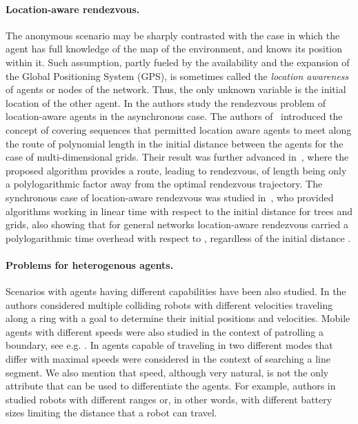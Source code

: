 \documentclass{llncs}
\begin{document}
\paragraph{Location-aware rendezvous.}
The anonymous scenario may be sharply contrasted with the case in which the agent has full knowledge of the map of the environment, and knows its position within it. Such assumption, partly fueled by the availability and the expansion of the Global Positioning System (GPS), is sometimes called the {\em location awareness} of agents or nodes of the network. Thus, the only unknown variable is the initial location of the other agent. In \cite{leszek-async,DISC10} the authors study the rendezvous problem of location-aware agents in the asynchronous case. The authors of~\cite{leszek-async} introduced the concept of covering sequences that permitted location aware agents to meet along the route of polynomial length in the initial distance  between the agents for the case of multi-dimensional grids. Their result was further advanced in~\cite{DISC10}, where the proposed algorithm provides a route, leading to rendezvous, of length being only a polylogarithmic factor away from the optimal rendezvous trajectory. The synchronous case of location-aware rendezvous was studied in~\cite{CCGKM11}, who provided algorithms working in linear time with respect to the initial distance  for trees and grids, also showing that for general networks location-aware rendezvous carried a polylogarithmic time overhead with respect to , regardless of the initial distance .

\paragraph{Problems for heterogenous agents.}
Scenarios with agents having different capabilities have been also studied.
In \cite{CzyzowiczKP13} the authors considered multiple colliding robots with different velocities traveling along a ring with a goal to determine their initial positions and velocities.
Mobile agents with different speeds were also studied in the context of patrolling a boundary, see e.g. \cite{CzyzowiczGKK11,KawamuraK12}.
In \cite{abs-1304-7693} agents capable of traveling in two different modes that differ with maximal speeds were considered in the context of searching a line segment.
We also mention that speed, although very natural, is not the only attribute that can be used to differentiate the agents.
For example, authors in \cite{Chalopin0MPW13} studied robots with different ranges or, in other words, with different battery sizes limiting the distance that a robot can travel.
\end{document}
